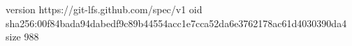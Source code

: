 version https://git-lfs.github.com/spec/v1
oid sha256:00f84bada94dabedf9c89b44554acc1e7cca52da6e3762178ac61d4030390da4
size 988
